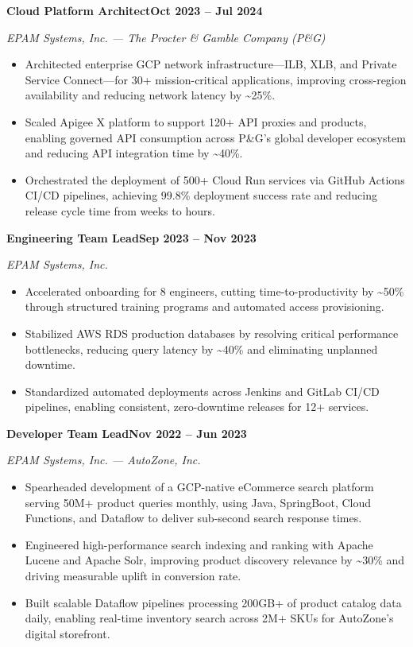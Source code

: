 \documentclass[11pt,letterpaper]{article}
\newcommand{\job}[3]{%
  \par\vspace{4pt}%
  \noindent\textbf{#1}\hfill\textbf{#3}%
  \par\vspace{1pt}\noindent\textit{#2}%
  \par\vspace{1pt}%
}
\begin{document}
\job{Cloud Platform Architect}{EPAM Systems, Inc. --- The Procter \& Gamble Company (P\&G)}{Oct 2023 -- Jul 2024}
\begin{itemize}
    \item Architected enterprise GCP network infrastructure---ILB, XLB, and Private Service Connect---for 30+ mission-critical applications, improving cross-region availability and reducing network latency by \textasciitilde{}25\%.
    \item Scaled Apigee X platform to support 120+ API proxies and products, enabling governed API consumption across P\&G's global developer ecosystem and reducing API integration time by \textasciitilde{}40\%.
    \item Orchestrated the deployment of 500+ Cloud Run services via GitHub Actions CI/CD pipelines, achieving 99.8\% deployment success rate and reducing release cycle time from weeks to hours.
\end{itemize}

\job{Engineering Team Lead}{EPAM Systems, Inc.}{Sep 2023 -- Nov 2023}
\begin{itemize}
    \item Accelerated onboarding for 8 engineers, cutting time-to-productivity by \textasciitilde{}50\% through structured training programs and automated access provisioning.
    \item Stabilized AWS RDS production databases by resolving critical performance bottlenecks, reducing query latency by \textasciitilde{}40\% and eliminating unplanned downtime.
    \item Standardized automated deployments across Jenkins and GitLab CI/CD pipelines, enabling consistent, zero-downtime releases for 12+ services.
\end{itemize}

\job{Developer Team Lead}{EPAM Systems, Inc. --- AutoZone, Inc.}{Nov 2022 -- Jun 2023}
\begin{itemize}
    \item Spearheaded development of a GCP-native eCommerce search platform serving 50M+ product queries monthly, using Java, SpringBoot, Cloud Functions, and Dataflow to deliver sub-second search response times.
    \item Engineered high-performance search indexing and ranking with Apache Lucene and Apache Solr, improving product discovery relevance by \textasciitilde{}30\% and driving measurable uplift in conversion rate.
    \item Built scalable Dataflow pipelines processing 200GB+ of product catalog data daily, enabling real-time inventory search across 2M+ SKUs for AutoZone's digital storefront.
\end{itemize}
\end{document}
